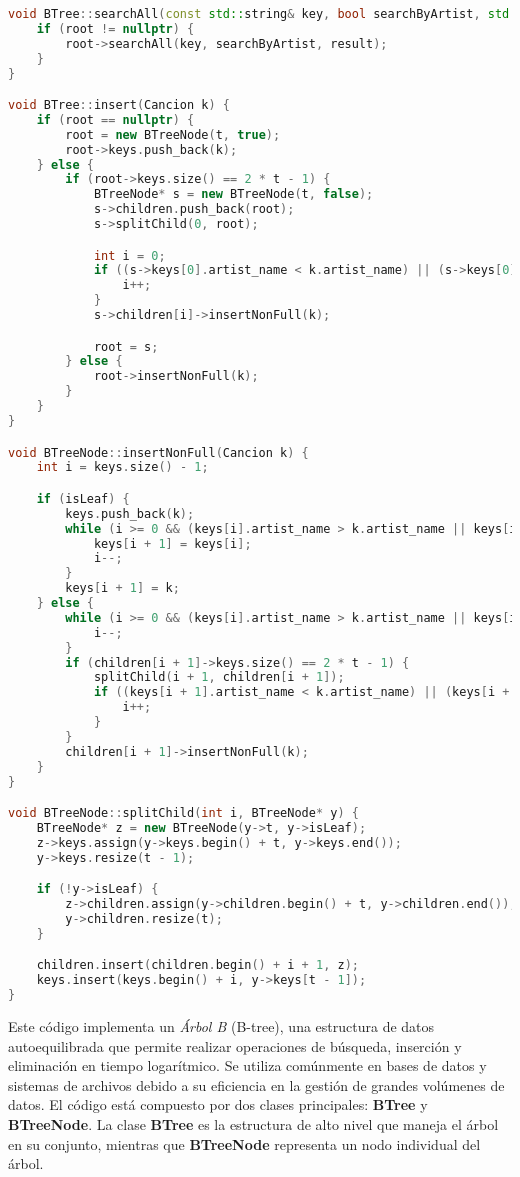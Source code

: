 \documentclass[12pt]{article}
\begin{document}
\begin{flushleft}
\begin{lstlisting}[language=C++, style=mystyle, caption={Código de un Árbol B}]
void BTree::searchAll(const std::string& key, bool searchByArtist, std::vector<Cancion>& result) {
    if (root != nullptr) {
        root->searchAll(key, searchByArtist, result);
    }
}

void BTree::insert(Cancion k) {
    if (root == nullptr) {
        root = new BTreeNode(t, true);
        root->keys.push_back(k);
    } else {
        if (root->keys.size() == 2 * t - 1) {
            BTreeNode* s = new BTreeNode(t, false);
            s->children.push_back(root);
            s->splitChild(0, root);

            int i = 0;
            if ((s->keys[0].artist_name < k.artist_name) || (s->keys[0].track_name < k.track_name)) {
                i++;
            }
            s->children[i]->insertNonFull(k);

            root = s;
        } else {
            root->insertNonFull(k);
        }
    }
}

void BTreeNode::insertNonFull(Cancion k) {
    int i = keys.size() - 1;

    if (isLeaf) {
        keys.push_back(k);
        while (i >= 0 && (keys[i].artist_name > k.artist_name || keys[i].track_name > k.track_name)) {
            keys[i + 1] = keys[i];
            i--;
        }
        keys[i + 1] = k;
    } else {
        while (i >= 0 && (keys[i].artist_name > k.artist_name || keys[i].track_name > k.track_name)) {
            i--;
        }
        if (children[i + 1]->keys.size() == 2 * t - 1) {
            splitChild(i + 1, children[i + 1]);
            if ((keys[i + 1].artist_name < k.artist_name) || (keys[i + 1].track_name < k.track_name)) {
                i++;
            }
        }
        children[i + 1]->insertNonFull(k);
    }
}

void BTreeNode::splitChild(int i, BTreeNode* y) {
    BTreeNode* z = new BTreeNode(y->t, y->isLeaf);
    z->keys.assign(y->keys.begin() + t, y->keys.end());
    y->keys.resize(t - 1);

    if (!y->isLeaf) {
        z->children.assign(y->children.begin() + t, y->children.end());
        y->children.resize(t);
    }

    children.insert(children.begin() + i + 1, z);
    keys.insert(keys.begin() + i, y->keys[t - 1]);
}
            \end{lstlisting}

            \noindent\hspace{4em}Este código implementa un \textit{Árbol B} (B-tree), una estructura de datos autoequilibrada que permite realizar operaciones de búsqueda, inserción y eliminación en tiempo logarítmico. Se utiliza comúnmente en bases de datos y sistemas de archivos debido a su eficiencia en la gestión de grandes volúmenes de datos. El código está compuesto por dos clases principales: \textbf{BTree} y \textbf{BTreeNode}. La clase \textbf{BTree} es la estructura de alto nivel que maneja el árbol en su conjunto, mientras que \textbf{BTreeNode} representa un nodo individual del árbol.
            

\end{flushleft}
\end{document}
